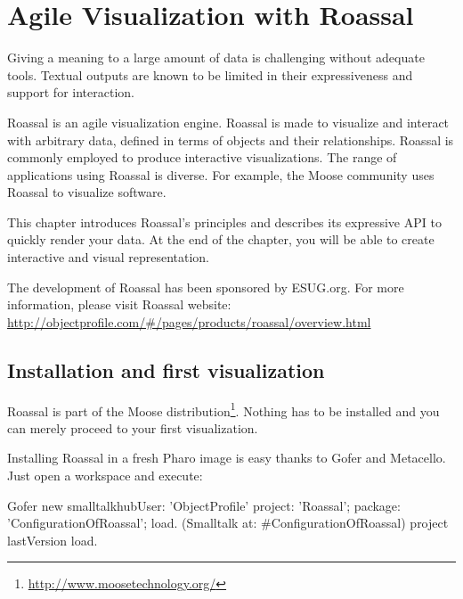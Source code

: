 \documentclass[a4paper,10pt,twoside]{book}
\begin{document}
\fi
\sloppy
\chapter{Agile Visualization with Roassal}


\chapterauthor{\authorvanessa}

Giving a meaning to a large amount of data is challenging without adequate tools. Textual outputs are known to be limited in their expressiveness and support for interaction. 

Roassal is an agile visualization engine. Roassal is made to visualize and interact with arbitrary data, defined in terms of objects and their relationships. Roassal is commonly employed to produce interactive visualizations. The range of applications using Roassal is diverse. For example, the Moose community uses Roassal to visualize software. 

This chapter introduces Roassal's principles and describes its expressive API to quickly render your data. At the end of the chapter, you will be able to create interactive and visual representation. 

The development of Roassal has been sponsored by ESUG.org. For more information, please visit Roassal website: \\\noindent \url{http://objectprofile.com/\#/pages/products/roassal/overview.html}



\section{Installation and first visualization}
Roassal is part of the Moose distribution\footnote{\url{http://www.moosetechnology.org/}}. Nothing has to be installed and you can merely proceed to your first visualization.

Installing Roassal in a fresh Pharo image is easy thanks to Gofer and Metacello. Just open a workspace and execute:

\begin{code}{}
Gofer new smalltalkhubUser: 'ObjectProfile'
	project: 'Roassal';
	package: 'ConfigurationOfRoassal';
	load.
(Smalltalk at: #ConfigurationOfRoassal) project lastVersion load.
\end{code}
\end{document}
